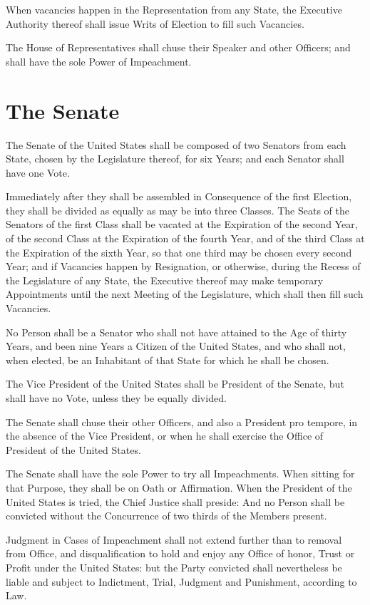 \documentclass{constitution}
\begin{document}
When vacancies happen in the Representation from any State,
the Executive Authority thereof shall issue Writs of Election to fill such Vacancies.

The House of Representatives shall chuse their Speaker and other Officers;
and shall have the sole Power of Impeachment.

\section{The Senate}
The Senate of the United States shall be composed of two Senators from each State, chosen by the Legislature thereof, for six Years;
and each Senator shall have one Vote.

Immediately after they shall be assembled in Consequence of the first Election,
they shall be divided as equally as may be into three Classes.
The Seats of the Senators of the first Class shall be vacated at the Expiration of the second Year,
of the second Class at the Expiration of the fourth Year,
and of the third Class at the Expiration of the sixth Year,
so that one third may be chosen every second Year;
and if Vacancies happen by Resignation, or otherwise, during the Recess of the Legislature of any State,
the Executive thereof may make temporary Appointments until the next Meeting of the Legislature,
which shall then fill such Vacancies.

No Person shall be a Senator who shall not have attained to the Age of thirty Years,
and been nine Years a Citizen of the United States,
and who shall not, when elected, be an Inhabitant of that State for which he shall be chosen.

The Vice President of the United States shall be President of the Senate,
but shall have no Vote, unless they be equally divided.

The Senate shall chuse their other Officers,
and also a President pro tempore, in the absence of the Vice President, or when he shall exercise the Office of President of the United States.

The Senate shall have the sole Power to try all Impeachments.
When sitting for that Purpose, they shall be on Oath or Affirmation.
When the President of the United States is tried, the Chief Justice shall preside:
And no Person shall be convicted without the Concurrence of two thirds of the Members present.

Judgment in Cases of Impeachment shall not extend further than to removal from Office, and disqualification to hold and enjoy any Office of honor, Trust or Profit under the United States:
but the Party convicted shall nevertheless be liable and subject to Indictment, Trial, Judgment and Punishment, according to Law.
\end{document}
